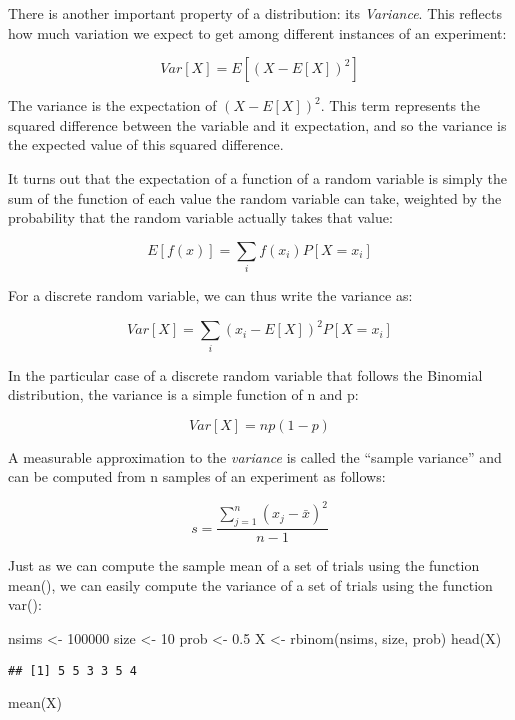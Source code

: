 \documentclass[
]{book}
\newenvironment{Shaded}{\begin{snugshade}}{\end{snugshade}}
\newcommand{\DecValTok}[1]{\textcolor[rgb]{0.00,0.00,0.81}{#1}}
\newcommand{\FloatTok}[1]{\textcolor[rgb]{0.00,0.00,0.81}{#1}}
\newcommand{\FunctionTok}[1]{\textcolor[rgb]{0.00,0.00,0.00}{#1}}
\newcommand{\NormalTok}[1]{#1}
\newcommand{\OtherTok}[1]{\textcolor[rgb]{0.56,0.35,0.01}{#1}}
\begin{document}
There is another important property of a distribution: its \emph{Variance}. This reflects how much variation we expect to get among different instances of an experiment:

\[Var[X] = E[(X-E[X])^{2}]\]

The variance is the expectation of \((X-E[X])^{2}\). This term represents the squared difference between the variable and it expectation, and so the variance is the expected value of this squared difference.

It turns out that the expectation of a function of a random variable is simply the sum of the function of each value the random variable can take, weighted by the probability that the random variable actually takes that value:

\[E[f(x)] = \sum_{i}f(x_i)P[X=x_i]\]

For a discrete random variable, we can thus write the variance as:

\[Var[X] = \sum_{i}(x_i-E[X])^{2}P[X=x_i]\]

In the particular case of a discrete random variable that follows the Binomial distribution, the variance is a simple function of n and p:

\[Var[X] = n p(1-p)\]

A measurable approximation to the \emph{variance} is called the ``sample variance'' and can be computed from n samples of an experiment as follows:

\[s = \frac{\sum_{j=1}^{n}(x_{j} - \bar{x})^{2}}{n-1}\]

Just as we can compute the sample mean of a set of trials using the function mean(), we can easily compute the variance of a set of trials using the function var():

\begin{Shaded}
\begin{Highlighting}[]
\NormalTok{nsims }\OtherTok{\textless{}{-}} \DecValTok{100000}
\NormalTok{size }\OtherTok{\textless{}{-}} \DecValTok{10}
\NormalTok{prob }\OtherTok{\textless{}{-}} \FloatTok{0.5}
\NormalTok{X }\OtherTok{\textless{}{-}} \FunctionTok{rbinom}\NormalTok{(nsims, size, prob)}
\FunctionTok{head}\NormalTok{(X)}
\end{Highlighting}
\end{Shaded}

\begin{verbatim}
## [1] 5 5 3 3 5 4
\end{verbatim}

\begin{Shaded}
\begin{Highlighting}[]
\FunctionTok{mean}\NormalTok{(X)}
\end{Highlighting}
\end{Shaded}
\end{document}
